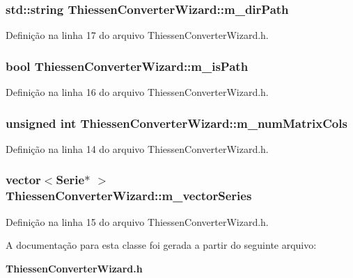 \subsubsection[{m\+\_\+dir\+Path}]{\setlength{\rightskip}{0pt plus 5cm}std\+::string Thiessen\+Converter\+Wizard\+::m\+\_\+dir\+Path\hspace{0.3cm}{\ttfamily [protected]}}\label{class_thiessen_converter_wizard_aa3370ad64270fcb24a20841a86f619cf}


Definição na linha 17 do arquivo Thiessen\+Converter\+Wizard.\+h.

\subsubsection[{m\+\_\+is\+Path}]{\setlength{\rightskip}{0pt plus 5cm}bool Thiessen\+Converter\+Wizard\+::m\+\_\+is\+Path\hspace{0.3cm}{\ttfamily [protected]}}\label{class_thiessen_converter_wizard_a947d47d8a2e90925039ae5fcbfc08bef}


Definição na linha 16 do arquivo Thiessen\+Converter\+Wizard.\+h.

\subsubsection[{m\+\_\+num\+Matrix\+Cols}]{\setlength{\rightskip}{0pt plus 5cm}unsigned int Thiessen\+Converter\+Wizard\+::m\+\_\+num\+Matrix\+Cols\hspace{0.3cm}{\ttfamily [protected]}}\label{class_thiessen_converter_wizard_a65a0f6669bcd5a49c609b58062bcbe6d}


Definição na linha 14 do arquivo Thiessen\+Converter\+Wizard.\+h.

\subsubsection[{m\+\_\+vector\+Series}]{\setlength{\rightskip}{0pt plus 5cm}vector$<${\bf Serie}$\ast$ $>$ Thiessen\+Converter\+Wizard\+::m\+\_\+vector\+Series\hspace{0.3cm}{\ttfamily [protected]}}\label{class_thiessen_converter_wizard_a9f5d9e5f54b1ea3368814dfdfc18a700}


Definição na linha 15 do arquivo Thiessen\+Converter\+Wizard.\+h.



A documentação para esta classe foi gerada a partir do seguinte arquivo\+:\begin{DoxyCompactItemize}
\item 
{\bf Thiessen\+Converter\+Wizard.\+h}\end{DoxyCompactItemize}
